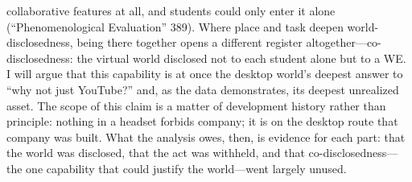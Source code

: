 collaborative features at all, and students could only enter it alone
(``Phenomenological Evaluation'' 389). Where place and task deepen
world-disclosedness, being there together opens a different register
altogether---co-disclosedness: the virtual world disclosed not to each student
alone but to a WE. I will argue that this capability is at once the desktop
world's deepest answer to ``why not just YouTube?'' and, as the data
demonstrates, its deepest unrealized asset. The scope of this claim is a matter
of development history rather than principle: nothing in a headset forbids
company; it is on the desktop route that company was built. What the analysis
owes, then, is evidence for each part: that the world was disclosed, that
the act was withheld, and that co-disclosedness---the one capability that could
justify the world---went largely unused.

